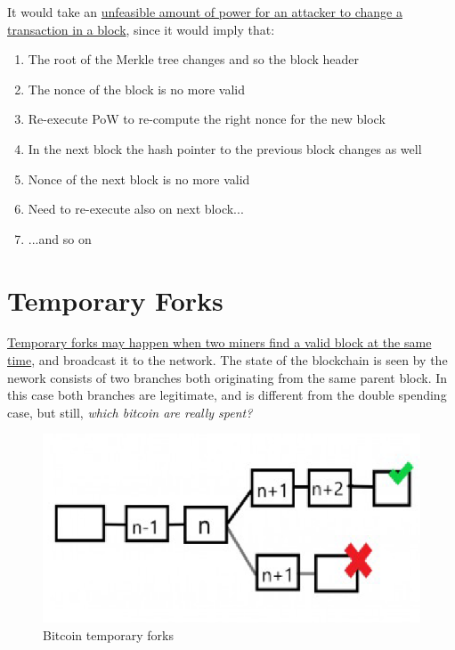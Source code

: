 \newpage
It would take an \ul{unfeasible amount of power for an attacker to change a transaction in a block}, since it would imply that: 
\begin{enumerate}
   \item The root of the Merkle tree changes and so the block header
   \item The nonce of the block is no more valid
   \item Re-execute PoW to re-compute the right nonce for the new block
   \item In the next block the hash pointer to the previous block changes as well
   \item Nonce of the next block is no more valid
   \item Need to re-execute also on next block...
   \item ...and so on
\end{enumerate}

\section{Temporary Forks}

\begin{paracol}{2}
   
   \colfill
   \ul{Temporary forks may happen when two miners find a valid block at the same time}, and broadcast it to the network.
   The state of the blockchain is seen by the nework consists of two branches both
   originating from the same parent block.
   In this case both branches are legitimate, and is different from the double spending case, but still, \textit{which bitcoin are really spent?}
   \colfill

   \switchcolumn

   \colfill
   \begin{figure}[htbp]
      \centering
      \includegraphics{images/bitcoin_forks.png}
      \caption{Bitcoin temporary forks}
      \label{fig:bitcoin_forks}
   \end{figure}
   \colfill
\end{paracol}
   

